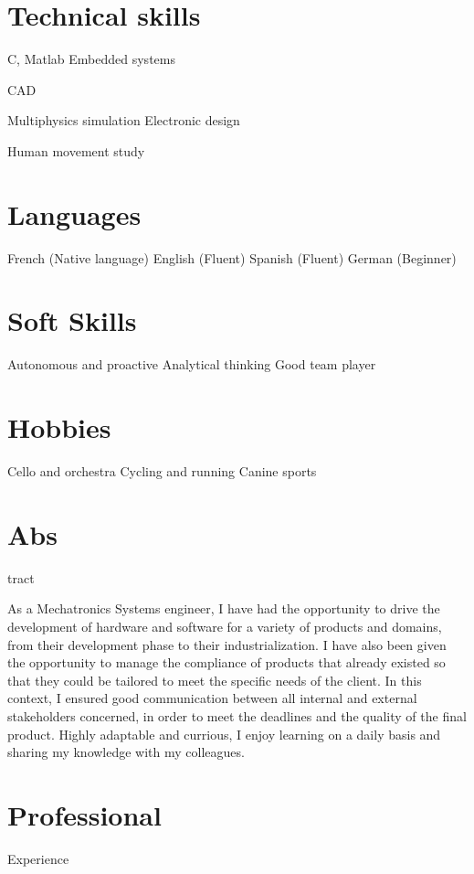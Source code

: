 \documentclass{cv-style}     %
\begin{document}
\begin{aside}
    \section{Technical skills}
    C, Matlab
    Embedded systems %

    CAD %

    Multiphysics simulation %
    Electronic design %
    
    Human movement study %
    \section{Languages}
    French (Native language)
    English (Fluent)
    Spanish (Fluent)
    German (Beginner)
    \section{Soft Skills}
    Autonomous and proactive
    Analytical thinking
    Good team player
    \section{Hobbies}
    Cello and orchestra
    Cycling and running
    Canine sports
\end{aside}

\section{Abs}{tract}

As a Mechatronics Systems engineer, I have had the opportunity to drive the development of hardware and software for a variety of products and domains,
from their development phase to their industrialization. I have also been given the opportunity to manage the compliance of products
that already existed so that they could be tailored to meet the specific needs of the client.
In this context, I ensured good communication between all internal and external stakeholders concerned,
in order to meet the deadlines and the quality of the final product.
Highly adaptable and currious, I enjoy learning on a daily basis and sharing my knowledge with my colleagues.

\section{Professional }{Experience}
\end{document}
